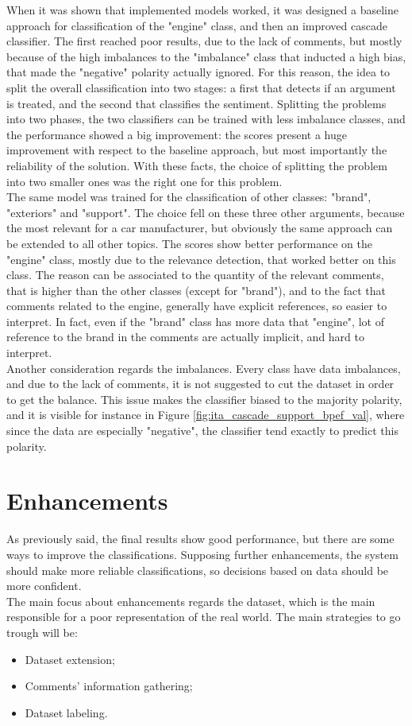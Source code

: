 When it was shown that implemented models worked, it was designed a baseline approach for classification of the "engine" class, and then an improved cascade classifier. The first reached poor results, due to the lack of comments, but mostly because of the high imbalances to the "imbalance" class that inducted a high bias, that made the "negative" polarity actually ignored. For this reason, the idea to split the overall classification into two stages: a first that detects if an argument is treated, and the second that classifies the sentiment. Splitting the problems into two phases, the two classifiers can be trained with less imbalance classes, and the performance showed a big improvement: the scores present a huge improvement with respect to the baseline approach, but most importantly the reliability of the solution. With these facts, the choice of splitting the problem into two smaller ones was the right one for this problem.\\
The same model was trained for the classification of other classes: "brand", "exteriors" and "support". The choice fell on these three other arguments, because the most relevant for a car manufacturer, but obviously the same approach can be extended to all other topics. The scores show better performance on the "engine" class, mostly due to the relevance detection, that worked better on this class. The reason can be associated to the quantity of the relevant comments, that is higher than the other classes (except for "brand"), and to the fact that comments related to the engine, generally have explicit references, so easier to interpret. In fact, even if the "brand" class has more data that "engine", lot of reference to the brand in the comments are actually implicit, and hard to interpret.\\
Another consideration regards the imbalances. Every class have data imbalances, and due to the lack of comments, it is not suggested to cut the dataset in order to get the balance. This issue makes the classifier biased to the majority polarity, and it is visible for instance in Figure \ref{fig:ita_cascade_support_bpef_val}, where since the data are especially "negative", the classifier tend exactly to predict this polarity.


\section{Enhancements}

As previously said, the final results show good performance, but there are some ways to improve the classifications. Supposing further enhancements, the system should make more reliable classifications, so decisions based on data should be more confident.\\
The main focus about enhancements regards the dataset, which is the main responsible for a poor representation of the real world. The main strategies to go trough will be:
\begin{itemize}
	\item Dataset extension;
	\item Comments' information gathering;
	\item Dataset labeling.
\end{itemize}

